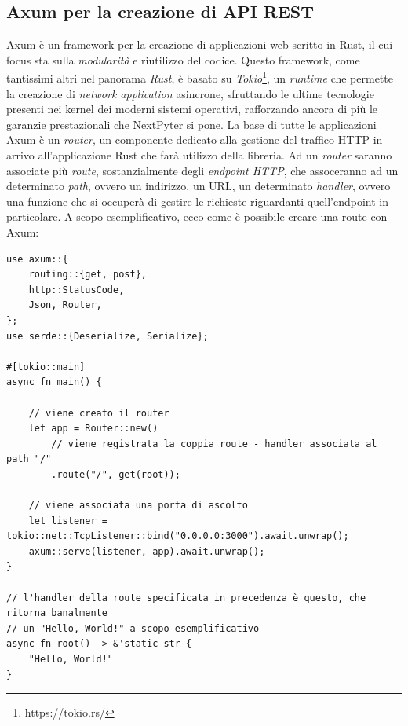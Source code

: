 \subsection{Axum per la creazione di API REST}
Axum è un framework per la creazione di applicazioni web scritto in Rust, il cui focus sta sulla \textit{modularità} e riutilizzo del codice.
\newline
Questo framework, come tantissimi altri nel panorama \textit{Rust}, è basato su \textit{Tokio}\footnote{https://tokio.rs/}, un \textit{runtime} che permette la creazione di \textit{network application} asincrone, sfruttando le ultime tecnologie presenti nei kernel dei moderni sistemi operativi, rafforzando ancora di più le garanzie prestazionali che NextPyter si pone.
\newline
La base di tutte le applicazioni Axum è un \textit{router}, un componente dedicato alla gestione del traffico HTTP in arrivo all'applicazione Rust che farà utilizzo della libreria.
\newline
Ad un \textit{router} saranno associate più \textit{route}, sostanzialmente degli \textit{endpoint HTTP}, che assoceranno ad un determinato \textit{path}, ovvero un indirizzo, un URL, un determinato \textit{handler}, ovvero una funzione che si occuperà di gestire le richieste riguardanti quell'endpoint in particolare.
\newline
A scopo esemplificativo, ecco come è possibile creare una route con Axum:
\begin{verbatim}
use axum::{
    routing::{get, post},
    http::StatusCode,
    Json, Router,
};
use serde::{Deserialize, Serialize};

#[tokio::main]
async fn main() {

    // viene creato il router
    let app = Router::new()
        // viene registrata la coppia route - handler associata al path "/"
        .route("/", get(root));

    // viene associata una porta di ascolto 
    let listener = tokio::net::TcpListener::bind("0.0.0.0:3000").await.unwrap();
    axum::serve(listener, app).await.unwrap();
}

// l'handler della route specificata in precedenza è questo, che ritorna banalmente 
// un "Hello, World!" a scopo esemplificativo
async fn root() -> &'static str {
    "Hello, World!"
}
\end{verbatim}
\newpage
